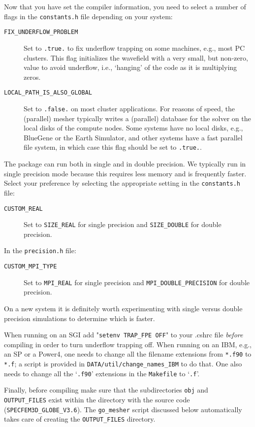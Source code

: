 \documentclass[onecolumn]{article}
\begin{document}
Now that you have set the compiler information, you need to select a
number of flags in the \texttt{constants.h} file depending on your
system:
\begin{description}
\item[\texttt{FIX\_UNDERFLOW\_PROBLEM}] Set to \texttt{.true.} to fix
underflow trapping on some machines, e.g., most PC clusters.
This flag initializes the wavefield with a very small, but non-zero,
value to avoid underflow, i.e., `hanging' of the code as it is
multiplying zeros.
\item[\texttt{LOCAL\_PATH\_IS\_ALSO\_GLOBAL}] Set to
\texttt{.false.} on most cluster applications.
For reasons of speed,
the (parallel) mesher typically writes a (parallel) database for
the solver on the local disks of the compute nodes.
Some systems have no local disks, e.g., BlueGene or the Earth Simulator,
and other systems have a fast parallel file system, in which case
this flag should be set to \texttt{.true.}.
\end{description}
The package can run both in single and in double precision.
We typically run in single precision mode because this requires less
memory and is frequently faster. Select your preference
by selecting the appropriate setting in the \texttt{constants.h} file:
\begin{description}
\item[\texttt{CUSTOM\_REAL}] Set to \texttt{SIZE\_REAL} for single
precision and \texttt{SIZE\_DOUBLE} for double precision.
\end{description}
In the \texttt{precision.h} file:
\begin{description}
\item[\texttt{CUSTOM\_MPI\_TYPE}] Set to \texttt{MPI\_REAL} for single
precision and \texttt{MPI\_DOUBLE\_PRECISION} for double precision.
\end{description}
On a new system it is definitely worth experimenting with single versus
double precision simulations to determine which is faster.

When running on an SGI add "\texttt{setenv TRAP\_FPE OFF}"
to your .cshrc file \textit{before} compiling in order to
turn underflow trapping off.
When running on an IBM, e.g., an SP or a Power4, one needs to change
all the filename extensions from \texttt{*.f90} to \texttt{*.f}; a script is provided
in \texttt{DATA/util/change\_names\_IBM} to do that.
One also needs to change all the `\texttt{.f90}' extensions in the
\texttt{Makefile} to `\texttt{.f}'.

Finally, before compiling make sure that the
subdirectories \texttt{obj} and \texttt{OUTPUT\_FILES} exist within the directory
with the source code (\texttt{SPECFEM3D\_GLOBE\_V3.6}).
The \texttt{go\_mesher} script discussed below automatically takes
care of creating the \texttt{OUTPUT\_FILES} directory.
\end{document}
